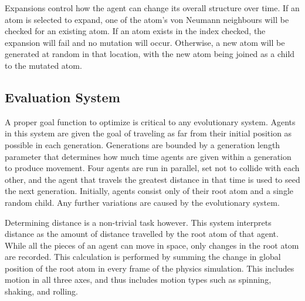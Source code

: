 \documentclass[runningheads]{llncs}
\begin{document}
Expansions control how the agent can change its overall structure over time.
If an atom is selected to expand, one of the atom's von Neumann neighbours will be checked for an existing atom.
If an atom exists in the index checked, the expansion will fail and no mutation will occur.
Otherwise, a new atom will be generated at random in that location, with the new atom being joined as a child to the mutated atom.

\subsection{Evaluation System}
A proper goal function to optimize is critical to any evolutionary system.
Agents in this system are given the goal of traveling as far from their initial position as possible in each generation.
Generations are bounded by a generation length parameter that determines how much time agents are given within a generation to produce movement.
Four agents are run in parallel, set not to collide with each other, and the agent that travels the greatest distance in that time is used to seed the next generation.
Initially, agents consist only of their root atom and a single random child.
Any further variations are caused by the evolutionary system.

Determining distance is a non-trivial task however.
This system interprets distance as the amount of distance travelled by the root atom of that agent.
While all the pieces of an agent can move in space, only changes in the root atom are recorded.
This calculation is performed by summing the change in global position of the root atom in every frame of the physics simulation.
This includes motion in all three axes, and thus includes motion types such as spinning, shaking, and rolling.
\end{document}
